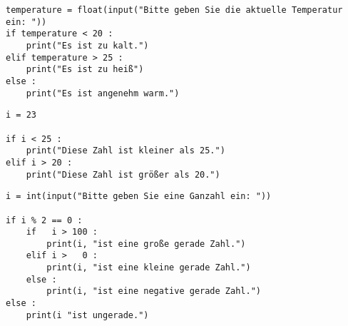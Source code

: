 
\begin{frame}[fragile]
%
\begin{codebox}
\begin{verbatim}
temperature = float(input("Bitte geben Sie die aktuelle Temperatur ein: "))
if temperature < 20 :
    print("Es ist zu kalt.")
elif temperature > 25 :
    print("Es ist zu heiß")
else :
    print("Es ist angenehm warm.")
\end{verbatim}
\end{codebox}
%
\begin{warnbox}[Fehlerhafter Code: \texttt{elif}, leftupper=6mm]
\begin{verbatim}
i = 23

if i < 25 :
    print("Diese Zahl ist kleiner als 25.")
elif i > 20 :
    print("Diese Zahl ist größer als 20.")
\end{verbatim}
\end{warnbox}
%
\end{frame}


\begin{frame}[fragile]
%
\begin{codebox}
\begin{verbatim}
i = int(input("Bitte geben Sie eine Ganzahl ein: "))

if i % 2 == 0 :
    if   i > 100 :
        print(i, "ist eine große gerade Zahl.")
    elif i >   0 :
        print(i, "ist eine kleine gerade Zahl.")
    else :
        print(i, "ist eine negative gerade Zahl.")
else :
    print(i "ist ungerade.")
\end{verbatim}
\end{codebox}
%
\end{frame}


